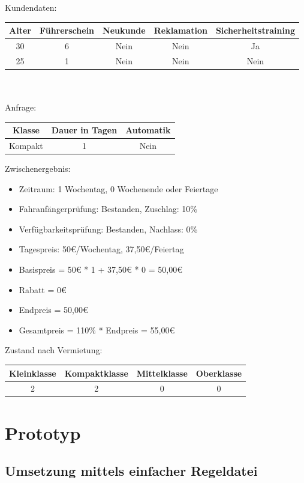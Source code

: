 Kundendaten:\\
\begin{tabular}{|c|c|c|c|c|}
	\hline \textbf{Alter} & \textbf{Führerschein} & \textbf{Neukunde} & \textbf{Reklamation} & \textbf{Sicherheitstraining} \\ 
	\hline 30 & 6 & Nein & Nein & Ja \\ 
	\hline 25 & 1 & Nein & Nein & Nein \\ 
	\hline 
\end{tabular} 
\\\\
Anfrage:\\
\begin{tabular}{|c|c|c|}
	\hline \textbf{Klasse} & \textbf{Dauer in Tagen} & \textbf{Automatik} \\ 
	\hline Kompakt & 1 & Nein \\ 
	\hline 
\end{tabular}

Zwischenergebnis:
\begin{itemize}
	\item Zeitraum: 1 Wochentag, 0 Wochenende oder Feiertage
	\item Fahranfängerprüfung: Bestanden, Zuschlag: 10\%
	\item Verfügbarkeitsprüfung: Bestanden, Nachlass: 0\%
	\item Tagespreis: 50€/Wochentag, 37,50€/Feiertag
	\item Basispreis = 50€ * 1 + 37,50€ * 0 = 50,00€
	\item Rabatt = 0€
	\item Endpreis = 50,00€
	\item Gesamtpreis = 110\% * Endpreis = 55,00€
\end{itemize}

Zustand nach Vermietung:\\
\begin{tabular}{|c|c|c|c|}
	\hline \textbf{Kleinklasse} & \textbf{Kompaktklasse} & \textbf{Mittelklasse} & \textbf{Oberklasse}  \\ 
	\hline 2 & 2 & 0 & 0 \\ 
	\hline 
\end{tabular}

\section{Prototyp}

\subsection{Umsetzung mittels einfacher Regeldatei}

